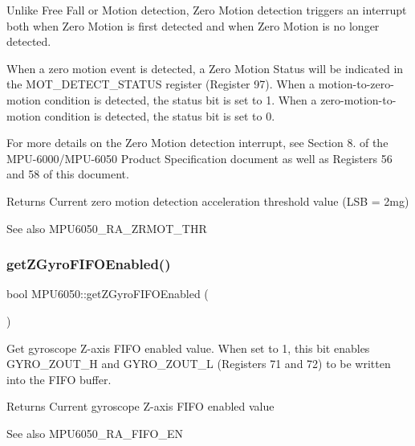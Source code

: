 Unlike Free Fall or Motion detection, Zero Motion detection triggers an interrupt both when Zero Motion is first detected and when Zero Motion is no longer detected.

When a zero motion event is detected, a Zero Motion Status will be indicated in the M\+O\+T\+\_\+\+D\+E\+T\+E\+C\+T\+\_\+\+S\+T\+A\+T\+US register (Register 97). When a motion-\/to-\/zero-\/motion condition is detected, the status bit is set to 1. When a zero-\/motion-\/to-\/ motion condition is detected, the status bit is set to 0.

For more details on the Zero Motion detection interrupt, see Section 8. of the M\+P\+U-\/6000/\+M\+P\+U-\/6050 Product Specification document as well as Registers 56 and 58 of this document.

\begin{DoxyReturn}{Returns}
Current zero motion detection acceleration threshold value (L\+SB = 2mg) 
\end{DoxyReturn}
\begin{DoxySeeAlso}{See also}
M\+P\+U6050\+\_\+\+R\+A\+\_\+\+Z\+R\+M\+O\+T\+\_\+\+T\+HR 
\end{DoxySeeAlso}
\mbox{\label{class_m_p_u6050_adbbbd131c74f37dd545403633eb317ff}} 
\subsubsection{\texorpdfstring{getZGyroFIFOEnabled()}{getZGyroFIFOEnabled()}}
{\footnotesize\ttfamily bool M\+P\+U6050\+::get\+Z\+Gyro\+F\+I\+F\+O\+Enabled (\begin{DoxyParamCaption}{ }\end{DoxyParamCaption})}

Get gyroscope Z-\/axis F\+I\+FO enabled value. When set to 1, this bit enables G\+Y\+R\+O\+\_\+\+Z\+O\+U\+T\+\_\+H and G\+Y\+R\+O\+\_\+\+Z\+O\+U\+T\+\_\+L (Registers 71 and 72) to be written into the F\+I\+FO buffer. \begin{DoxyReturn}{Returns}
Current gyroscope Z-\/axis F\+I\+FO enabled value 
\end{DoxyReturn}
\begin{DoxySeeAlso}{See also}
M\+P\+U6050\+\_\+\+R\+A\+\_\+\+F\+I\+F\+O\+\_\+\+EN 
\end{DoxySeeAlso}
\mbox{\label{class_m_p_u6050_a3601b732eb15644212b8f29cf396e142}} 
